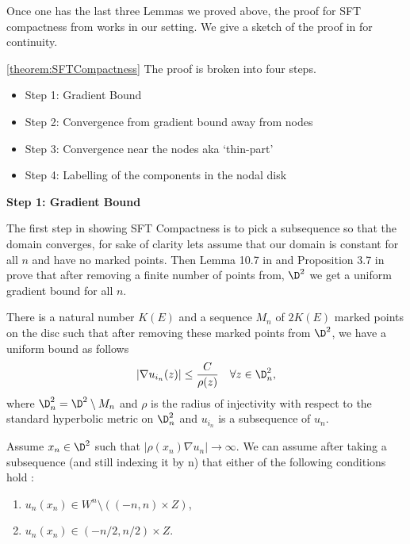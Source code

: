 Once one has the last three Lemmas we proved above, the proof for SFT compactness from \cite{bhewz} works in our setting. We give a sketch of the proof in \cite{bhewz} for continuity.


\begin{sketch}{\ref{theorem:SFTCompactness}}
The proof is broken into four steps.
\begin{itemize}
    \item Step 1: Gradient Bound
    \item Step 2: Convergence from gradient bound away from nodes
    \item Step 3: Convergence near the nodes aka `thin-part'
    \item Step 4: Labelling of the components in the nodal disk
\end{itemize}

\vskip 3pt
\textbf{Step 1: Gradient Bound}

The first step in showing SFT Compactness is to pick a subsequence so that the domain converges, for sake of clarity lets assume that our domain is constant for all $n$ and have no marked points. Then Lemma 10.7 in \cite{bhewz} and Proposition 3.7 in \cite{Abbasbook} prove that after removing a finite number of points from, $\D^2$ we get a uniform gradient bound for all $n$. 

\begin{lemma}
There is a natural number $K(E)$ and a sequence $M_n$ of $2K(E)$ marked points on the disc such that after removing these marked points from $\D^2$, we have a uniform bound as follows $$|\nabla u_{i_n}(z)| \leq \frac{C}{\rho(z)} \quad \forall z\in \D^2_n,$$where $\D^2_n = \D^2 \setminus M_n$ and $\rho$ is the radius of injectivity with respect to the standard hyperbolic metric on $\D^2_n$ and $u_{i_n}$ is a subsequence of $u_n$. 
\end{lemma}

\begin{prooflemma*}
Assume $x_n \in \D^2$ such that $|\rho(x_n) \nabla u_n | \to \infty$. We can assume after taking a subsequence (and still indexing it by n) that either of the following conditions hold :
\begin{enumerate}
   
    \item $u_n(x_n) \in W^n \setminus ( (-n,n)\times Z) $,
    \item $u_n(x_n) \in  (-n/2,n/2) \times Z$.
\end{enumerate}


\end{prooflemma*}
\end{sketch}
